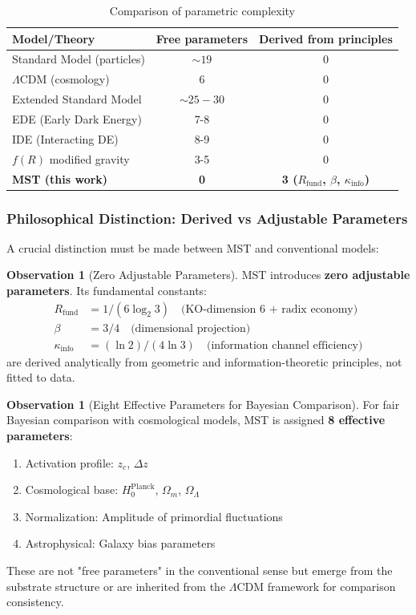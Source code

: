 \documentclass[11pt, a4paper]{article}
\theoremstyle{plain}
\theoremstyle{definition}
\newtheorem{observation}[theorem]{Observation}
\newcommand{\Rfactor}{R_{\text{fund}}}
\newcommand{\Kinfo}{\kappa_{\text{info}}}
\begin{document}
\begin{table}[H]
\centering
\caption{Comparison of parametric complexity}
\label{tab:parsimony}
\begin{tabular}{lcc}
\toprule
\textbf{Model/Theory} & \textbf{Free parameters} & \textbf{Derived from principles} \\
\midrule
Standard Model (particles) & $\sim 19$ & 0 \\
$\Lambda$CDM (cosmology) & 6 & 0 \\
Extended Standard Model & $\sim 25-30$ & 0 \\
\addlinespace
EDE (Early Dark Energy) & 7-8 & 0 \\
IDE (Interacting DE) & 8-9 & 0 \\
$f(R)$ modified gravity & 3-5 & 0 \\
\addlinespace
\rowcolor{blue!10}
\textbf{MST (this work)} & \textbf{0} & \textbf{3 ($\Rfactor$, $\beta$, $\Kinfo$)} \\
\bottomrule
\end{tabular}
\end{table}

\subsubsection{Philosophical Distinction: Derived vs Adjustable Parameters}

A crucial distinction must be made between MST and conventional models:

\begin{observation}[Zero Adjustable Parameters]
MST introduces \textbf{zero adjustable parameters}. Its fundamental constants:
\begin{align}
\Rfactor &= 1/(6\log_2 3) \quad \text{(KO-dimension 6 + radix economy)} \\
\beta &= 3/4 \quad \text{(dimensional projection)} \\
\Kinfo &= (\ln 2)/(4\ln 3) \quad \text{(information channel efficiency)}
\end{align}
are derived analytically from geometric and information-theoretic principles, not fitted to data.
\end{observation}

\begin{observation}[Eight Effective Parameters for Bayesian Comparison]
For fair Bayesian comparison with cosmological models, MST is assigned \textbf{8 effective parameters}:
\begin{enumerate}
    \item Activation profile: $z_c$, $\Delta z$
    \item Cosmological base: $H_0^{\text{Planck}}$, $\Omega_m$, $\Omega_\Lambda$
    \item Normalization: Amplitude of primordial fluctuations
    \item Astrophysical: Galaxy bias parameters
\end{enumerate}
These are not "free parameters" in the conventional sense but emerge from the substrate structure or are inherited from the $\Lambda$CDM framework for comparison consistency.
\end{observation}
\end{document}
